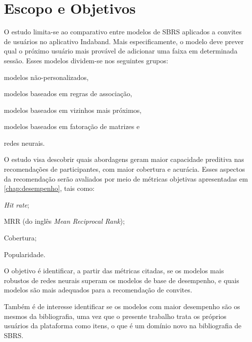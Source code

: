 \section{Escopo e Objetivos}

O estudo limita-se ao comparativo entre modelos de SBRS aplicados a convites de
usuários no aplicativo Indaband. Mais especificamente, o modelo deve prever qual
o próximo usuário mais provável de adicionar uma faixa em determinada sessão.
Esses modelos dividem-se nos seguintes grupos: 
\begin{inparaenum}[(1)]
  \item modelos não-personalizados,
  \item modelos baseados em regras de associação,
  \item modelos baseados em vizinhos mais próximos,
  \item modelos baseados em fatoração de matrizes e
  \item redes neurais.
\end{inparaenum}

O estudo visa descobrir quais abordagens geram maior capacidade preditiva nas
recomendações de participantes, com maior cobertura e acurácia. Esses aspectos
da recomendação serão avaliados por meio de métricas objetivas apresentadas em
\ref{chap:desempenho}, tais como: 
\begin{inparaenum}[(1)]
  \item \textit{Hit rate};
  \item MRR (do inglês \textit{Mean Reciprocal Rank});
  \item Cobertura;
  \item Popularidade.
\end{inparaenum}

O objetivo é identificar, a partir das métricas citadas, se os modelos mais
robustos de redes neurais superam os modelos de base de desempenho, e quais
modelos são mais adequados para a recomendação de convites.

Também é de interesse identificar se os modelos com maior desempenho são os
mesmos da bibliografia, uma vez que o presente trabalho trata os próprios
usuários da plataforma como itens, o que é um domínio novo na bibliografia de
SBRS.
